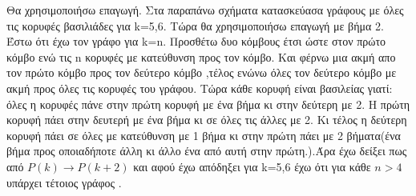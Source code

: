 \documentclass{article}
\begin{document}
\begin{enumerate}
\begin{figure}[ht!]
\end{figure} 
Θα χρησιμοποιήσω επαγωγή. Στα παραπάνω σχήματα κατασκεύασα γράφους με όλες τις κορυφές βασιλιάδες για k=5,6. Τώρα θα χρησιμοποιήσω επαγωγή με βήμα 2. Έστω ότι έχω τον γράφο για k=n. Προσθέτω δυο κόμβους έτσι ώστε στον πρώτο κόμβο ενώ τις n κορυφές με κατεύθυνση προς τον κόμβο. Και φέρνω μια ακμή απο τον πρώτο κόμβο προς τον δεύτερο κόμβο ,τέλος ενώνω όλες τον δεύτερο κόμβο με ακμή προς όλες τις κορυφές του γράφου.
Τώρα κάθε κορυφή είναι βασιλείας γιατί: όλες η κορυφές πάνε στην πρώτη κορυφή με ένα βήμα κι στην δεύτερη με 2. Η πρώτη κορυφή πάει στην δευτερή με ένα βήμα κι σε όλες τις άλλες με 2. Κι τέλος η δεύτερη κορυφή πάει σε όλες με κατεύθυνση με 1 βήμα κι στην πρώτη πάει με 2 βήματα(ένα βήμα προς οποιαδήποτε άλλη κι άλλο ένα από αυτή στην πρώτη.).Άρα έχω δείξει πως από $P(k)\rightarrow P(k+2)$ και αφού έχω απόδηξει για k=5,6 έχω ότι για κάθε $n>4$ υπάρχει τέτοιος γράφος  .
\end{enumerate}
\end{document}
